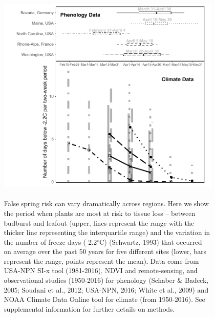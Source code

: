 \documentclass{article}\usepackage[]{graphicx}\usepackage[]{color}
\begin{document}
\begin{figure} [H] 
 \begin{center}
 \includegraphics[width=12cm, height=11cm]{..//figure/regionalrisk_sites_bw.pdf} 
 \caption{False spring risk can vary dramatically across regions. Here we show the period when plants are most at risk to tissue loss -- between budburst and leafout (upper, lines represent the range with the thicker line representing the interquartile range) and the variation in the number of freeze days (-2.2$^{\circ}$C) (Schwartz, 1993) that occurred on average over the past 50 years for five different sites (lower, bars represent the range, points represent the mean). Data come from USA-NPN SI-x tool (1981-2016), NDVI and remote-sensing, and observational studies (1950-2016) for phenology (Schaber \& Badeck, 2005; Soudani et al., 2012; USA-NPN, 2016; White et al., 2009) and NOAA Climate Data Online tool for climate (from 1950-2016). See supplemental information for further details on methods. } \label{fig:region}  
 \end{center}
 \end{figure}
\end{document}
